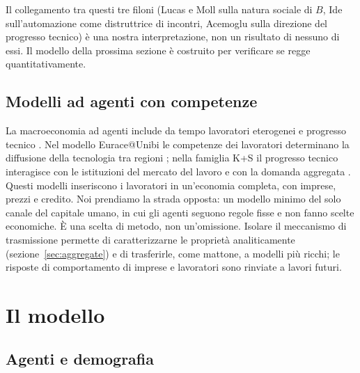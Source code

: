 \documentclass[preprint,12pt,authoryear]{elsarticle}
\begin{document}
Il collegamento tra questi tre filoni (Lucas e Moll sulla natura sociale di $B$, Ide sull'automazione come distruttrice di incontri, Acemoglu sulla direzione del progresso tecnico) è una nostra interpretazione, non un risultato di nessuno di essi. Il modello della prossima sezione è costruito per verificare se regge quantitativamente.

\subsection{Modelli ad agenti con competenze}

La macroeconomia ad agenti include da tempo lavoratori eterogenei e progresso tecnico \citep{Tesfatsion2006,DawidDelliGatti2018}. Nel modello Eurace@Unibi le competenze dei lavoratori determinano la diffusione della tecnologia tra regioni \citep{Dawid2012}; nella famiglia K+S il progresso tecnico interagisce con le istituzioni del mercato del lavoro e con la domanda aggregata \citep{Dosi2010,Dosi2017}. Questi modelli inseriscono i lavoratori in un'economia completa, con imprese, prezzi e credito. Noi prendiamo la strada opposta: un modello minimo del solo canale del capitale umano, in cui gli agenti seguono regole fisse e non fanno scelte economiche. È una scelta di metodo, non un'omissione. Isolare il meccanismo di trasmissione permette di caratterizzarne le proprietà analiticamente (sezione~\ref{sec:aggregate}) e di trasferirle, come mattone, a modelli più ricchi; le risposte di comportamento di imprese e lavoratori sono rinviate a lavori futuri.

\section{Il modello}\label{sec:model}

\subsection{Agenti e demografia}
\end{document}
